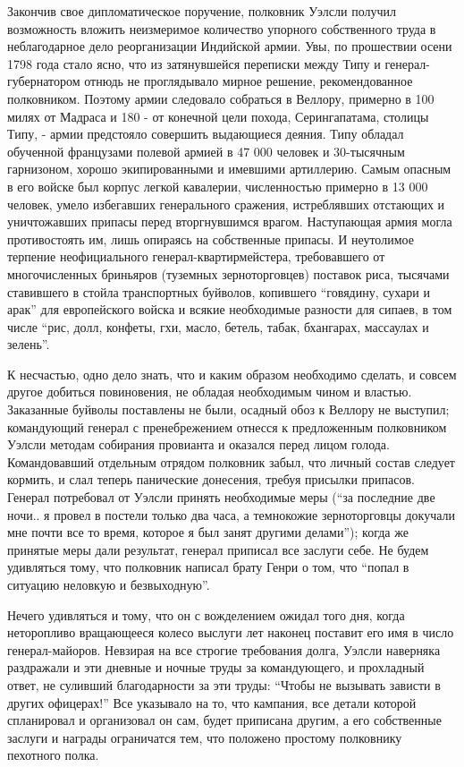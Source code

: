 \documentclass[
  oneside,
  12pt,
  titlepage]{book}
\begin{document}
Закончив свое дипломатическое поручение, полковник Уэлсли получил возможность вложить неизмеримое количество упорного собственного труда в неблагодарное дело реорганизации Индийской армии. Увы, по прошествии осени 1798 года стало ясно, что из затянувшейся переписки между Типу и генерал-губернатором отнюдь не проглядывало мирное решение, рекомендованное полковником. Поэтому армии следовало собраться в Веллору, примерно в 100 милях от Мадраса и 180 - от конечной цели похода, Серингапатама, столицы Типу, - армии предстояло совершить выдающиеся деяния. Типу обладал обученной французами полевой армией в 47 000 человек и 30-тысячным гарнизоном, хорошо экипированными и имевшими артиллерию. Самым опасным в его войске был корпус легкой кавалерии, численностью примерно в 13 000 человек, умело избегавших генерального сражения, истреблявших отстающих и уничтожавших припасы перед вторгнувшимся врагом. Наступающая армия могла противостоять им, лишь опираясь на собственные припасы. И неутолимое терпение неофициального генерал-квартирмейстера, требовавшего от многочисленных бриньяров (туземных зерноторговцев) поставок риса, тысячами ставившего в стойла транспортных буйволов, копившего ``говядину, сухари и арак'' для европейского войска и всякие необходимые разности для сипаев, в том числе ``рис, долл, конфеты, гхи, масло, бетель, табак, бхангарах, массаулах и зелень''.

К несчастью, одно дело знать, что и каким образом необходимо сделать, и совсем другое добиться повиновения, не обладая необходимым чином и властью. Заказанные буйволы поставлены не были, осадный обоз к Веллору не выступил; командующий генерал с пренебрежением отнесся к предложенным полковником Уэлсли методам собирания провианта и оказался перед лицом голода. Командовавший отдельным отрядом полковник забыл, что личный состав следует кормить, и слал теперь панические донесения, требуя присылки припасов. Генерал потребовал от Уэлсли принять необходимые меры (``за последние две ночи.. я провел в постели только два часа, а темнокожие зерноторговцы докучали мне почти все то время, которое я был занят другими делами''); когда же принятые меры дали результат, генерал приписал все заслуги себе. Не будем удивляться тому, что полковник написал брату Генри о том, что ``попал в ситуацию неловкую и безвыходную''.

Нечего удивляться и тому, что он с вожделением ожидал того дня, когда неторопливо вращающееся колесо выслуги лет наконец поставит его имя в число генерал-майоров. Невзирая на все строгие требования долга, Уэлсли наверняка раздражали и эти дневные и ночные труды за командующего, и прохладный ответ, не суливший благодарности за эти труды: ``Чтобы не вызывать зависти в других офицерах!'' Все указывало на то, что кампания, все детали которой спланировал и организовал он сам, будет приписана другим, а его собственные заслуги и награды ограничатся тем, что положено простому полковнику пехотного полка.
\end{document}
